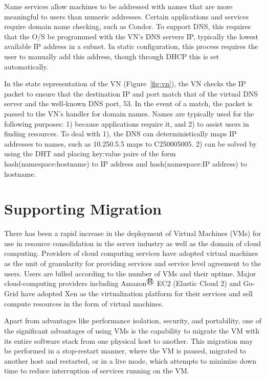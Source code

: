 Name services allow machines to be addressed with names that are more
meaningful to users than numeric addresses.  Certain applications and services
require domain name checking, such as Condor.  To support DNS, this requires
that the O/S be programmed with the VN's DNS servers IP, typically the lowest
available IP address in a subnet.  In static configuration, this process
requires the user to manually add this address, though through DHCP this is set
automatically.

In the state representation of the VN (Figure~\ref{fig:vn}), the VN checks the
IP packet to ensure that the destination IP and port match that of the virtual
DNS server and the well-known DNS port, 53.  In the event of a match, the
packet is passed to the VN's handler for domain names.  Names are typically
used for the following purposes: 1) because applications require it, and 2) to
assist users in finding resources.  To deal with 1), the DNS can
deterministically maps IP addresses to names, such as 10.250.5.5 maps to
C250005005.  2) can be solved by using the DHT and placing key:value pairs of
the form hash(namespace:hostname) to IP address and hash(namespace:IP address)
to hostname.

\section{Supporting Migration}

There has been a rapid increase in the deployment of Virtual Machines (VMs) for
use in resource consolidation in the server industry as well as the domain of
cloud computing.  Providers of cloud computing services have adopted virtual
machines as the unit of granularity for providing services and service level
agreement to the users.  Users are billed according to the number of VMs and
their uptime. Major cloud-computing providers including Amazon$^\registered$ EC2 (Elastic
Cloud 2) and Go-Grid have adopted Xen as the virtualization platform for their
services and sell compute resources in the form of virtual machines.

Apart from advantages like performance isolation, security, and portability,
one of the significant advantages of using VMs is the capability to migrate the
VM with its entire software stack from one physical host to another.  This
migration may be performed in a stop-restart manner, where the VM is paused,
migrated to another host and restarted, or in a live mode, which attempts to
minimize down time to reduce interruption of services running on the VM.

